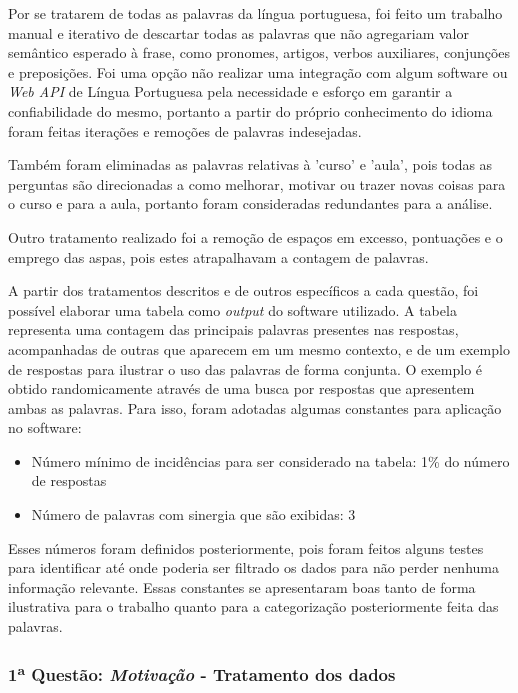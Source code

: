 Por se tratarem de todas as palavras da língua portuguesa, foi feito um trabalho manual e iterativo de descartar todas as palavras que não agregariam valor semântico esperado à frase, como pronomes, artigos, verbos auxiliares, conjunções e preposições. Foi uma opção não realizar uma integração com algum software ou \textit{Web API} de Língua Portuguesa pela necessidade e esforço em garantir a confiabilidade do mesmo, portanto a partir do próprio conhecimento do idioma foram feitas iterações e remoções de palavras indesejadas.

Também foram eliminadas as palavras relativas à 'curso' e 'aula', pois todas as perguntas são direcionadas a como melhorar, motivar ou trazer novas coisas para o curso e para a aula, portanto foram consideradas redundantes para a análise.

Outro tratamento realizado foi a remoção de espaços em excesso, pontuações e o emprego das aspas, pois estes atrapalhavam a contagem de palavras.

A partir dos tratamentos descritos e de outros específicos a cada questão, foi possível elaborar uma tabela como \textit{output} do software utilizado. A tabela representa uma contagem das principais palavras presentes nas respostas, acompanhadas de outras que aparecem em um mesmo contexto, e de um exemplo de respostas para ilustrar o uso das palavras de forma conjunta. O exemplo é obtido randomicamente através de uma busca por respostas que apresentem ambas as palavras. Para isso, foram adotadas algumas constantes para aplicação no software:

\begin{itemize}
\item Número mínimo de incidências para ser considerado na tabela: 1\% do número de respostas
\item Número de palavras com sinergia que são exibidas: 3
\end{itemize}

Esses números foram definidos posteriormente, pois foram feitos alguns testes para identificar até onde poderia ser filtrado os dados para não perder nenhuma informação relevante. Essas constantes se apresentaram boas tanto de forma ilustrativa para o trabalho quanto para a categorização posteriormente feita das palavras.

\subsubsection*{1\textsuperscript{a} Questão: \textit{Motivação} - Tratamento dos dados }

